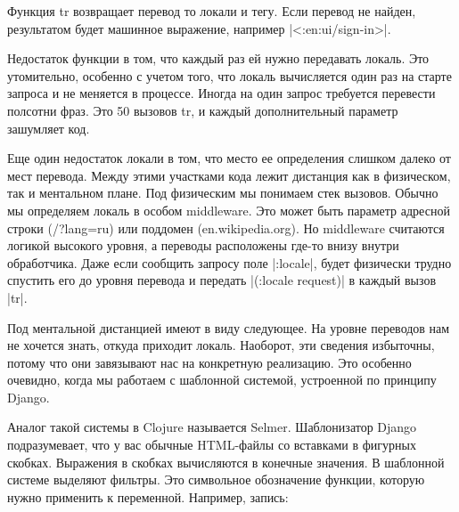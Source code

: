 Функция tr возвращает перевод то локали и тегу. Если перевод не найден,
результатом будет машинное выражение, например \spverb|<:en:ui/sign-in>|.

Недостаток функции в том, что каждый раз ей нужно передавать локаль. Это
утомительно, особенно с учетом того, что локаль вычисляется один раз на старте
запроса и не меняется в процессе. Иногда на один запрос требуется перевести
полсотни фраз. Это 50 вызовов tr, и каждый дополнительный параметр зашумляет
код.

Еще один недостаток локали в том, что место ее определения слишком далеко от
мест перевода. Между этими участками кода лежит дистанция как в физическом, так
и ментальном плане. Под физическим мы понимаем стек вызовов. Обычно мы
определяем локаль в особом middleware. Это может быть параметр адресной строки
(/?lang=ru) или поддомен (en.wikipedia.org). Но middleware считаются логикой
высокого уровня, а переводы расположены где-то внизу внутри обработчика. Даже
если сообщить запросу поле \spverb|:locale|, будет физически трудно спустить его до
уровня перевода и передать \spverb|(:locale request)| в каждый вызов \spverb|tr|.

Под ментальной дистанцией имеют в виду следующее. На уровне переводов нам не
хочется знать, откуда приходит локаль. Наоборот, эти сведения избыточны, потому
что они завязывают нас на конкретную реализацию. Это особенно очевидно, когда мы
работаем с шаблонной системой, устроенной по принципу Django.

Аналог такой системы в Clojure называется Selmer. Шаблонизатор Django
подразумевает, что у вас обычные HTML-файлы со вставками в фигурных
скобках. Выражения в скобках вычисляются в конечные значения. В шаблонной
системе выделяют фильтры. Это символьное обозначение функции, которую нужно
применить к переменной. Например, запись:

